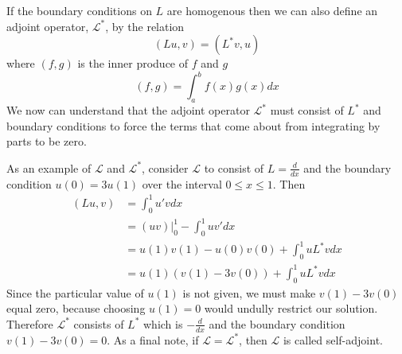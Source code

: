 If the boundary conditions on \(L\) are homogenous then we can also define an adjoint operator, \(\mathcal{L}^*\), by the relation
\begin{equation}
	(Lu,v) = (L^*v,u)
\end{equation}
where \((f,g)\) is the inner produce of \(f\) and \(g\)
\begin{equation}
	(f,g) = \int_a^bf(x)g(x)dx
\end{equation}
We now can understand that the adjoint operator \(\mathcal{L}^*\) must consist of \(L^*\) and boundary conditions to force the terms that come about from integrating by parts to be zero.

As an example of \(\mathcal{L}\) and \(\mathcal{L}^*\), consider \(\mathcal{L}\) to consist of \(L=\frac{d}{dx}\) and the boundary condition \(u(0)=3u(1)\) over the interval \(0\leq x \leq 1\). Then
\begin{equation}
	\begin{split}
		(Lu,v) &= \int_0^1u'vdx\\
		       &= (uv)\biggr\rvert_0^1 - \int_0^1 uv'dx\\
		       &= u(1)v(1)-u(0)v(0)+\int_0^1uL^*vdx\\
		       &= u(1)(v(1)-3v(0)) + \int_0^1uL^*vdx
	\end{split}
\end{equation}
Since the particular value of \(u(1)\) is not given, we must make \(v(1)-3v(0)\) equal zero, because choosing \(u(1)=0\) would undully restrict our solution. Therefore \(\mathcal{L^*}\) consists of \(L^*\) which is \(-\frac{d}{dx}\) and the boundary condition \(v(1) - 3v(0)=0\). As a final note, if \(\mathcal{L}=\mathcal{L}^*\), then \(\mathcal{L}\) is called self-adjoint.
